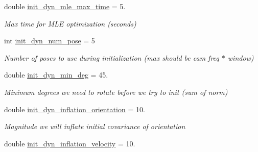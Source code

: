 \begin{DoxyCompactItemize}
double \hyperlink{structov__init_1_1InertialInitializerOptions_ade879e2b38eb03ebe50bbd4cbd5a1ba6}{init\+\_\+dyn\+\_\+mle\+\_\+max\+\_\+time} = 5.
\begin{DoxyCompactList}\small\item\em Max time for M\+LE optimization (seconds) \end{DoxyCompactList}\item 
\mbox{\label{structov__init_1_1InertialInitializerOptions_a77d404c5b0dd4a9957f7e857e759f538}} 
int \hyperlink{structov__init_1_1InertialInitializerOptions_a77d404c5b0dd4a9957f7e857e759f538}{init\+\_\+dyn\+\_\+num\+\_\+pose} = 5
\begin{DoxyCompactList}\small\item\em Number of poses to use during initialization (max should be cam freq $\ast$ window) \end{DoxyCompactList}\item 
\mbox{\label{structov__init_1_1InertialInitializerOptions_a3f6fb9d845f5fb69bb5e38ba1776d98a}} 
double \hyperlink{structov__init_1_1InertialInitializerOptions_a3f6fb9d845f5fb69bb5e38ba1776d98a}{init\+\_\+dyn\+\_\+min\+\_\+deg} = 45.
\begin{DoxyCompactList}\small\item\em Minimum degrees we need to rotate before we try to init (sum of norm) \end{DoxyCompactList}\item 
\mbox{\label{structov__init_1_1InertialInitializerOptions_ac18caae89ce58c128ddb0c9afdcb65fd}} 
double \hyperlink{structov__init_1_1InertialInitializerOptions_ac18caae89ce58c128ddb0c9afdcb65fd}{init\+\_\+dyn\+\_\+inflation\+\_\+orientation} = 10.
\begin{DoxyCompactList}\small\item\em Magnitude we will inflate initial covariance of orientation \end{DoxyCompactList}\item 
\mbox{\label{structov__init_1_1InertialInitializerOptions_aafab6a5eca4819a84137bd93452ba30a}} 
double \hyperlink{structov__init_1_1InertialInitializerOptions_aafab6a5eca4819a84137bd93452ba30a}{init\+\_\+dyn\+\_\+inflation\+\_\+velocity} = 10.

\end{DoxyCompactItemize}
